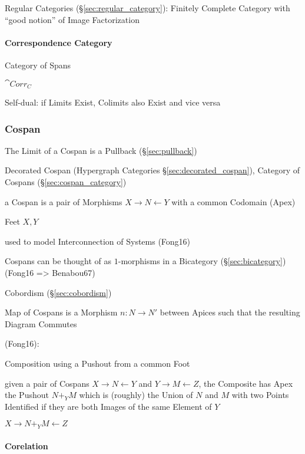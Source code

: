 \fist Regular Categories (\S\ref{sec:regular_category}): Finitely
Complete Category with ``good notion'' of Image Factorization



\paragraph{Correspondence Category}\label{sec:correspondence_category}\hfill

Category of Spans

$\cat{Corr_C}$

Self-dual: if Limits Exist, Colimits also Exist and vice versa



\subsubsection{Cospan}\label{sec:cospan}

The Limit of a Cospan is a Pullback (\S\ref{sec:pullback})

\fist Decorated Cospan (Hypergraph Categories
\S\ref{sec:decorated_cospan}), Category of Cospans
(\S\ref{sec:cospan_category})

a Cospan is a pair of Morphisms $X \rightarrow N \leftarrow Y$ with a
common Codomain (Apex)

Feet $X,Y$

used to model Interconnection of Systems (Fong16)

Cospans can be thought of as $1$-morphisms in a Bicategory
(\S\ref{sec:bicategory}) (Fong16 => Benabou67)

Cobordism (\S\ref{sec:cobordism})

Map of Cospans is a Morphism $n : N \rightarrow N'$ between Apices
such that the resulting Diagram Commutes

(Fong16):

Composition using a Pushout from a common Foot

given a pair of Cospans $X \rightarrow N \leftarrow Y$ and $Y
\rightarrow M \leftarrow Z$, the Composite has Apex the Pushout $N +_Y
M$ which is (roughly) the Union of $N$ and $M$ with two Points
Identified if they are both Images of the same Element of $Y$

$X \rightarrow N +_Y M \leftarrow Z$



\paragraph{Corelation}\label{sec:corelation}\hfill

